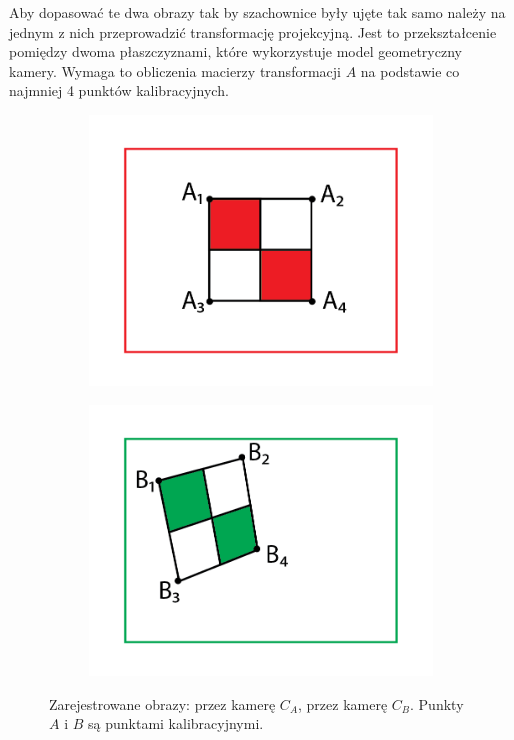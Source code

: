 Aby dopasować te dwa obrazy tak by szachownice były ujęte tak samo należy na jednym z nich przeprowadzić  transformację projekcyjną. Jest to przekształcenie pomiędzy dwoma płaszczyznami, które wykorzystuje model geometryczny kamery. Wymaga to obliczenia macierzy transformacji $A$ na podstawie co najmniej 4 punktów kalibracyjnych. 

\begin{figure}[h]
\centering
\begin{subfigure}{0.30\textwidth}
\centering
\includegraphics[width=1\textwidth]{images/camAimage}
\subcaption{\label{fig:camAimage}}
\end{subfigure}
\begin{subfigure}{0.30\textwidth}
\centering
\includegraphics[width=1\textwidth]{images/camBimage}
\subcaption{\label{fig:camBimage}}
\end{subfigure}
\caption{\label{fig:camImages}Zarejestrowane obrazy: \protect{} przez kamerę $C_A$, \protect{} przez kamerę $C_B$. Punkty $A$ i $B$ są punktami kalibracyjnymi.}
\end{figure}

